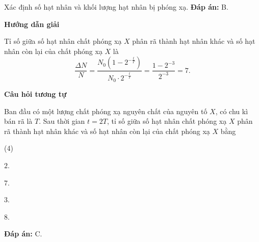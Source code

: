 \begin{dang}{Xác định số hạt nhân và khối lượng hạt nhân bị phóng xạ.}
{	\textbf{Đáp án:} B.
	}
	{
	\begin{center}
		\textbf{Hướng dẫn giải}
	\end{center}
	
	Tỉ số giữa số hạt nhân chất phóng xạ $X$ phân rã thành hạt nhân khác và số hạt nhân còn lại của chất phóng xạ $X$ là
	\begin{equation*}
	\dfrac{\Delta N}{N}=\dfrac{N_0\left( 1-2^{-\frac{t}{T}}\right)}{N_0\cdot 2^{-\frac{t}{T}}}=\dfrac{1-2^{-3}}{2^{-3}}=7.
	\end{equation*}
	
	\begin{center}
		\textbf{Câu hỏi tương tự}
	\end{center}
	
	Ban đầu có một lượng chất phóng xạ nguyên chất của nguyên tố $X$, có chu kì bán rã là $T$. Sau thời gian $t=2T$, tỉ số giữa số hạt nhân chất phóng xạ $X$ phân rã thành hạt nhân khác và số hạt nhân còn lại của chất phóng xạ $X$ bằng
	\begin{mcq}(4)
		\item $2$.
		\item $7$.
		\item $3$.
		\item $8$.
	\end{mcq}
	
	\textbf{Đáp án:} C.}

\end{dang}


